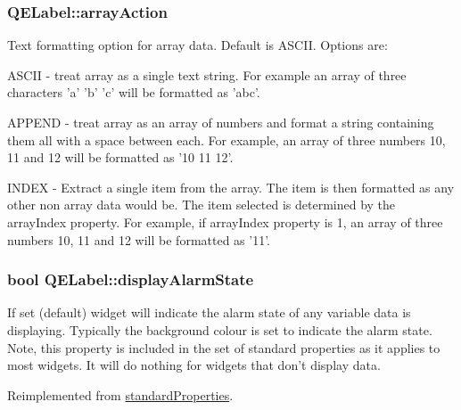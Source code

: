 \hypertarget{classQELabel_a977fd9a4156e6fa13213a03bc9168be2}{
\subsubsection[{arrayAction}]{ QELabel::arrayAction}}
\label{classQELabel_a977fd9a4156e6fa13213a03bc9168be2}
Text formatting option for array data. Default is ASCII. Options are: \begin{DoxyItemize}
\item ASCII -\/ treat array as a single text string. For example an array of three characters 'a' 'b' 'c' will be formatted as 'abc'. \item APPEND -\/ treat array as an array of numbers and format a string containing them all with a space between each. For example, an array of three numbers 10, 11 and 12 will be formatted as '10 11 12'. \item INDEX -\/ Extract a single item from the array. The item is then formatted as any other non array data would be. The item selected is determined by the arrayIndex property. For example, if arrayIndex property is 1, an array of three numbers 10, 11 and 12 will be formatted as '11'. \end{DoxyItemize}
\hypertarget{classQELabel_ac25e8c10f2017824c1995ffee7fa363c}{
\subsubsection[{displayAlarmState}]{\setlength{\rightskip}{0pt plus 5cm}bool QELabel::displayAlarmState}}
\label{classQELabel_ac25e8c10f2017824c1995ffee7fa363c}
If set (default) widget will indicate the alarm state of any variable data is displaying. Typically the background colour is set to indicate the alarm state. Note, this property is included in the set of standard properties as it applies to most widgets. It will do nothing for widgets that don't display data. 

Reimplemented from \hyperlink{classstandardProperties}{standardProperties}.

